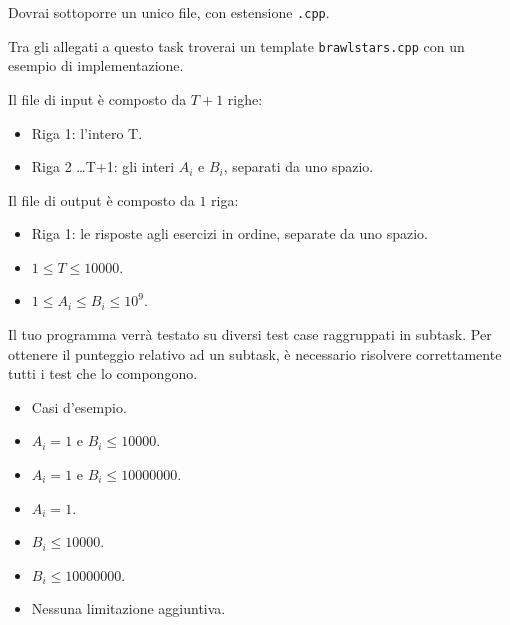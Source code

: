 \Implementation

Dovrai sottoporre un unico file, con estensione \texttt{.cpp}.

\begin{warning}
    Tra gli allegati a questo task troverai un template \texttt{brawlstars.cpp} con un esempio di implementazione.
\end{warning}

Il file di input è composto da $T+1$ righe:
\begin{itemize}
    \item Riga 1: l'intero T.
    \item Riga 2 \dots T+1: gli interi $A_i$ e $B_i$, separati da uno spazio.
\end{itemize}

Il file di output è composto da $1$ riga:
\begin{itemize}
    \item Riga 1: le risposte agli esercizi in ordine, separate da uno spazio.
\end{itemize}


\Constraints

\begin{itemize}[nolistsep, itemsep=2mm]
    \item $1 \le T \le 10000$.
    \item $1 \leq A_i \leq B_i \leq 10^9$.
\end{itemize}


\Scoring

Il tuo programma verrà testato su diversi test case raggruppati in subtask.
Per ottenere il punteggio relativo ad un subtask,
è necessario risolvere correttamente tutti i test che lo compongono.

\begin{itemize}[nolistsep,itemsep=2mm]
    \item \subtask Casi d'esempio.
    \item \subtask $A_i = 1$ e $B_i \leq 10000$.
    \item \subtask $A_i = 1$ e $B_i \leq 10000000$.
    \item \subtask $A_i = 1$.
    \item \subtask $B_i \leq 10000$.
    \item \subtask $B_i \leq 10000000$.
    \item \subtask Nessuna limitazione aggiuntiva.
\end{itemize}

